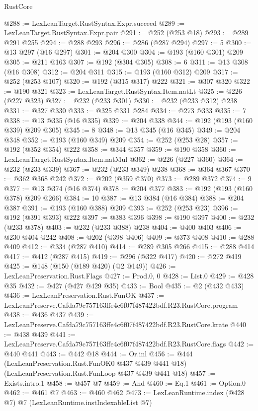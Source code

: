 \begin{lexlean}{RustCore}
\begin{coremodule}
@288 := LexLeanTarget.RustSyntax.Expr.succeed
@289 := LexLeanTarget.RustSyntax.Expr.pair
@291 := @252 (@253 @18)
@293 := @289 @291 @255
@294 := @288 @293
@296 := @286 (@287 @294)
@297 := 5
@300 := @13 @297 (@16 @297)
@301 := @204 @300
@304 := @193 (@160 @301) @209
@305 := @211 @163
@307 := @192 (@304 @305)
@308 := 6
@311 := @13 @308 (@16 @308)
@312 := @204 @311
@315 := @193 (@160 @312) @209
@317 := @252 (@253 @107)
@320 := @192 (@315 @317) @222
@321 := @307 @320
@322 := @190 @321
@323 := LexLeanTarget.RustSyntax.Item.natLt
@325 := @226 (@227 @323)
@327 := @232 (@233 @301)
@330 := @232 (@233 @312) @238
@331 := @327 @330
@333 := @325 @331 @284
@334 := @273 @333
@335 := 7
@338 := @13 @335 (@16 @335)
@339 := @204 @338
@344 := @192 (@193 (@160 @339) @209 @305)
@345 := 8
@348 := @13 @345 (@16 @345)
@349 := @204 @348
@352 := @193 (@160 @349) @209
@354 := @252 (@253 @28)
@357 := @192 (@352 @354) @222
@358 := @344 @357
@359 := @190 @358
@360 := LexLeanTarget.RustSyntax.Item.natMul
@362 := @226 (@227 @360)
@364 := @232 (@233 @339)
@367 := @232 (@233 @349) @238
@368 := @364 @367
@370 := @362 @368 @242
@372 := @202 (@359 @370)
@373 := @289 @372
@374 := 9
@377 := @13 @374 (@16 @374)
@378 := @204 @377
@383 := @192 (@193 (@160 @378) @209 @266)
@384 := 10
@387 := @13 @384 (@16 @384)
@388 := @204 @387
@391 := @193 (@160 @388) @209
@393 := @252 (@253 @23)
@396 := @192 (@391 @393) @222
@397 := @383 @396
@398 := @190 @397
@400 := @232 (@233 @378)
@403 := @232 (@233 @388) @238
@404 := @400 @403
@406 := @230 @404 @242
@408 := @202 (@398 @406)
@409 := @373 @408
@410 := @288 @409
@412 := @334 (@287 @410)
@414 := @289 @305 @266
@415 := @288 @414
@417 := @412 (@287 @415)
@419 := @296 (@322 @417)
@420 := @272 @419
@425 := @148 (@150 (@189 @420) (@2 @149))
@426 := LexLeanPreservation.Rust.Flags
@427 := Prod.{0, 0}
@428 := List.{0}
@429 := @428 @35
@432 := @427 (@427 @429 @35)
@433 := Bool
@435 := @2 (@432 @433)
@436 := LexLeanPreservation.Rust.FunOK
@437 := LexLeanPreserve.Cafda79c757163ffe4c6f07f487422bdf.R23.RustCore.program
@438 := @436 @437
@439 := LexLeanPreserve.Cafda79c757163ffe4c6f07f487422bdf.R23.RustCore.krate
@440 := @438 @439
@441 := LexLeanPreserve.Cafda79c757163ffe4c6f07f487422bdf.R23.RustCore.flags
@442 := @440 @441
@443 := @442 @18
@444 := Or.inl
@456 := @444
    (LexLeanPreservation.Rust.FunOK0 @437 @439 @441 @18)
    (LexLeanPreservation.Rust.FunLoop @437 @439 @441 @18)
@457 := Exists.intro.{1}
@458 := @457 @7
@459 := And
@460 := Eq.{1}
@461 := Option.{0}
@462 := @461 @7
@463 := @460 @462
@473 := LexLeanRuntime.index
    (@428 @7)
    @7
    (LexLeanRuntime.instIndexableList @7)

\end{coremodule}
\end{lexlean}
